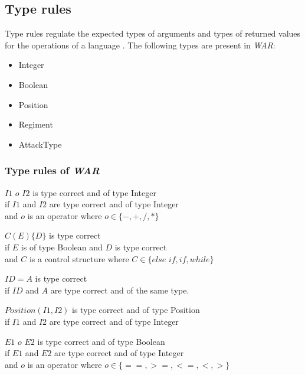\subsection{Type rules}
	Type rules regulate the expected types of arguments and 
	types of returned values for the operations of a language \cite{TypeRule}.
	The following types are present in \textit{WAR}: \\
	\begin{itemize}
		\item Integer
		\item Boolean
		\item Position
		\item Regiment
		\item AttackType
	\end{itemize}
		
	\subsubsection{Type rules of \textit{WAR}}
	\begin{typerule} 
		$I1$ $ o $ $I2$ is type correct and of type Integer \\
		if $I1$ and $I2$ are type correct and of type Integer \\
		and $o$ is an operator where $o\in \{-,+,/,* \}$
	\end{typerule}
	\begin{typerule} 
		$C(E)\{D\}$ is type correct\\
		if $E$ is of type Boolean and $D$ is type correct \\
		and $C$ is a control structure where $C \in \{else$ $if, if, while\}$
	\end{typerule}
	\begin{typerule} 
		$ID = A$ is type correct\\
		if $ID$ and $A$ are type correct and of the same type.
	\end{typerule}
	\begin{typerule} 
		$Position(I1,I2)$ is type correct and of type Position\\
		if $I1$ and $I2$ are type correct and of type Integer
	\end{typerule}
	\begin{typerule} 
		$E1$ $ o $ $E2$ is type correct and of type Boolean\\
		if $E1$ and $E2$ are type correct and of type Integer \\
		and $o$ is an operator where $o\in \{ ==,>=,<=,<,> \}$
	\end{typerule}